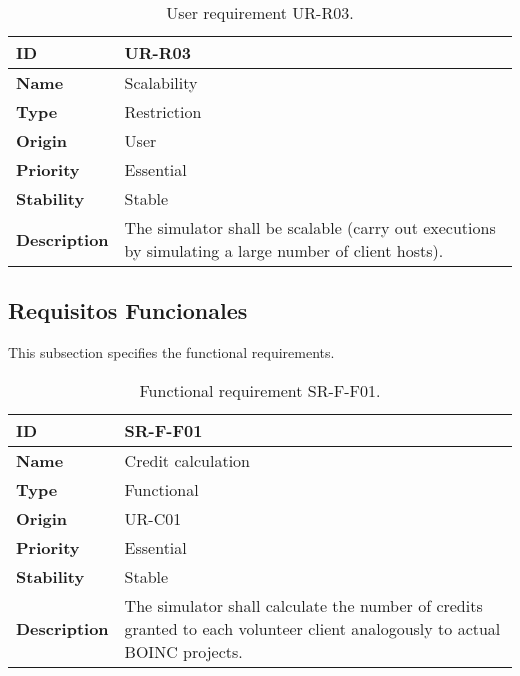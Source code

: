 \begin{center}
\begin{table*}[htbp]
\centering
\begin{tabular}{@{}p{2.5cm} p{9cm}@{}} 
\toprule
\textbf{ID} 				& UR-R03\\
\midrule
\textbf{Name} 			& Scalability \\
\midrule
\textbf{Type} 			& Restriction \\
\midrule
\textbf{Origin} 			& User \\
\midrule
\textbf{Priority}		& Essential \\
\midrule
\textbf{Stability} 		& Stable \\
\midrule
\textbf{Description} 	& The simulator shall be scalable (carry out executions by simulating a large number of client hosts). \\
\bottomrule
\end{tabular}
\caption{User requirement UR-R03.}
\label{tab:urr03}
\end{table*}
\end{center}

\fi

\clearpage
\subsection{Requisitos Funcionales}

This subsection specifies the functional requirements.

\begin{center}
\begin{table*}[htbp]
\centering
\begin{tabular}{@{}p{2.5cm} p{9cm}@{}} 
\toprule
\textbf{ID} 				& SR-F-F01\\
\midrule
\textbf{Name} 			& Credit calculation \\
\midrule
\textbf{Type} 			& Functional \\
\midrule
\textbf{Origin} 			& UR-C01 \\
\midrule
\textbf{Priority}		& Essential \\
\midrule
\textbf{Stability} 		& Stable \\
\midrule
\textbf{Description} 	& The simulator shall calculate the number of credits granted to each volunteer client analogously to actual BOINC projects. \\
\bottomrule
\end{tabular}
\caption{Functional requirement SR-F-F01.}
\label{tab:srff01}
\end{table*}
\end{center}


